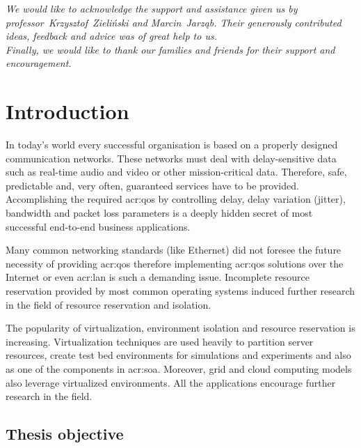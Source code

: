 \documentclass[11pt,openany]{book}
\begin{document}
	\begin{center}
    \textit{We would like to acknowledge the support and assistance given us by professor~Krzysztof~Zieliński and
            Marcin~Jarząb. Their generously contributed ideas, feedback and advice was of great help to us. \\
            Finally, we would like to thank our families and friends for their support and encouragement.}
  \end{center}

  \tableofcontents

  \listoffigures

  \newpage


  \chapter{Introduction}
  \label{chap:intro}

    In today's world every successful organisation is based on a properly designed communication networks. These networks
    must deal with delay-sensitive data such as real-time audio and video or other mission-critical data. Therefore,
    safe, predictable and, very often, guaranteed services have to be provided. Accomplishing the required \gls{acr:qos}
    by controlling delay, delay variation (jitter), bandwidth and packet loss parameters is a deeply hidden secret of most
    successful end-to-end business applications.
    
    Many common networking standards (like Ethernet) did not foresee the future necessity of providing \gls{acr:qos}
    therefore implementing \gls{acr:qos} solutions over the Internet or even \gls{acr:lan} is such a demanding issue.
    Incomplete resource reservation provided by most common operating systems induced further research in the field of
    resource reservation and isolation. 


    The popularity of virtualization, environment isolation and resource reservation is increasing. Virtualization
    techniques are used heavily to partition server resources, create test bed environments for simulations and
    experiments and also as one of the components in \gls{acr:soa}. Moreover, grid and cloud computing models also
    leverage virtualized environments. All the applications encourage further research in the field.


    \section{Thesis objective}
\end{document}
